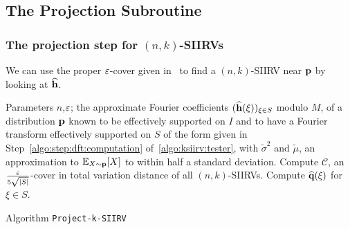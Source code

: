  
\subsection{The Projection Subroutine}\label{sec:projections}
\subsubsection{The projection step for $(n,k)$-SIIRVs}

We can use the proper $\varepsilon$-cover given in~\cite{DKS:15} to find a $(n,k)$-SIIRV near $\mathbf{p}$ by looking at $\widehat{\mathbf{h}}$.

\begin{algorithm}[ht]
  \begin{algorithmic}[1]
    \Require Parameters $n$,$\varepsilon$; the approximate Fourier coefficients $(\widehat{\mathbf{h}}(\xi))_{\xi\in S}$ modulo $M$, of a distribution $\mathbf{p}$ known to be effectively supported on $I$ and to have a Fourier transform effectively supported on $S$ of the form given in Step~\ref{algo:step:dft:computation} of~\cref{algo:ksiirv:tester}, with $\widetilde{\sigma}^2$
and $\widetilde{\mu}$, an approximation to $\mathbb{E}_{X \sim \mathbf{p}}[X]$ to within half a standard deviation.
	\State \label{step:cover:ksiirv} Compute $\mathcal{C}$, an $\frac{\varepsilon}{5\sqrt{|S|}}$-cover in total variation distance of all $(n,k)$-SIIRVs.
		 \label{step:cover:moment-test}
			\State Compute $\widehat{\mathbf{q}}(\xi)$ for $\xi \in S$.
				\Return \accept
			\EndIf
		\EndIf
	\EndFor
	\State \Return \reject {}
  \end{algorithmic}
  \caption{Algorithm \texttt{Project-k-SIIRV}}\label{algo:ksiirv-easy-projection}
\end{algorithm}

